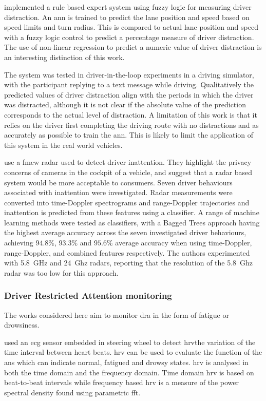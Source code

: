 \documentclass[11pt, parskip=half*,twoside=false]{scrbook}
\begin{document}
\citet{aksjonovDetectionEvaluationDriver2019} implemented a rule based expert system using fuzzy logic for measuring driver distraction. An \gls{ann} is trained to predict the lane position and speed based on speed limits and turn radius. This is compared to actual lane position and speed with a fuzzy logic control to predict a percentage measure of driver distraction. The use of non-linear regression to predict a numeric value of driver distraction is an interesting distinction of this work.

The system was tested in driver-in-the-loop experiments in a driving simulator, with the participant replying to a text message while driving. Qualitatively the predicted values of driver distraction align with the periods in which the driver was distracted, although it is not clear if the absolute value of the prediction corresponds to the actual level of distraction. A limitation of this work is that it relies on the driver first completing the driving route with no distractions and as accurately as possible to train the \gls{ann}. This is likely to limit the application of this system in the real world vehicles.

 \citet{dingInattentiveDrivingBehavior2019} use a \gls{fmcw} radar used to detect driver inattention. They highlight the privacy concerns of cameras in the cockpit of a vehicle, and suggest that a radar based system would be more acceptable to consumers. Seven driver behaviours associated with inattention were investigated. Radar measurements were converted into time-Doppler spectrograms and range-Doppler trajectories and inattention is predicted from these features using a classifier. A range of machine learning methods were tested as classifiers, with a Bagged Trees approach having the highest average accuracy across the seven investigated driver behaviours, achieving $94.8\%$, $93.3\%$ and $95.6\%$ average accuracy when using time-Doppler, range-Doppler, and combined features respectively. The authors experimented with 5.8~GHz and 24~Ghz radars, reporting that the resolution of the 5.8~Ghz radar was too low for this approach.
 

\subsubsection{Driver Restricted Attention monitoring}
The works considered here aim to monitor \gls{dra} in the form of fatigue or drowsiness.
 
\citet{jungDriverFatigueDrowsiness2014} used an \gls{ecg} sensor embedded in steering wheel to detect \gls{hrv}\textemdash the variation of the time interval between heart beats. \gls{hrv} can be used to evaluate the function of the \gls{ans} which can indicate normal, fatigued and drowsy states. \gls{hrv} is analysed in both the time domain and the frequency domain. Time domain \gls{hrv} is based on beat-to-beat intervals while frequency based \gls{hrv} is a measure of the power spectral density found using parametric \gls{fft}.
\end{document}
